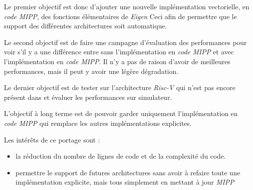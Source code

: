 Le premier objectif est donc d'ajouter une nouvelle implémentation vectorielle, en
\emph{code MIPP}, des fonctions élémentaires de \emph{Eigen} Ceci afin de permettre que le
support des différentes architectures soit automatique.

Le second objectif est de faire une campagne d'évaluation des performances pour voir
s'il y a une différence entre \Eigen sans l'implémentation en \emph{code MIPP} et
\Eigen avec l'implémentation en \emph{code MIPP}. Il n'y a pas de raison d'avoir
de meilleures performances, mais il peut y avoir une légère dégradation.

Le dernier objectif est de tester \Eigen sur l'architecture \emph{Risc-V} qui n'est
pas encore présent dans \Eigen et évaluer les performances sur simulateur.

L'objectif à long terme est de pouvoir garder uniquement l'implémentation en
\emph{code MIPP} qui remplace les autres implémentations explicites.

Les intérêts de ce portage sont :
\begin{itemize}
  \item la réduction du nombre de lignes de code et de la complexité du code.
  \item permettre le support de futures architectures sans avoir à refaire toute une
  implémentation explicite, mais tous simplement en mettant à jour \emph{MIPP}
\end{itemize}
